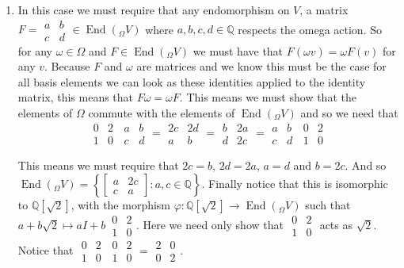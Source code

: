 \documentclass[12pt]{amsart}
\theoremstyle{definition}
\newcommand{\Q}{\mathbb{Q}}
\DeclareMathOperator{\End}{\mathrm{End}}
\newcommand{\ra}{\rightarrow}
\begin{document}
\begin{enumerate}
\item In this case we must require that any endomorphism on $V$, a matrix $F= \boxed{\begin{matrix}
a & b\\
c & d
\end{matrix}}\in \End(_\Omega  V)$ where $a,b,c,d\in\Q$ respects the omega action. So for any $\omega\in \Omega$ and $F\in\End(_\Omega  V)$ we must have that $F(\omega v)=\omega F(v)$ for any $v$. Because $F$ and $\omega$ are matrices and we know this must be the case for all basis elements we can look as these identities applied to the identity matrix, this means that $F\omega=\omega F$. This means we must show that the elements of $\Omega$ commute with the elements of $\End(_\Omega V)$ and so we need that
$$\boxed{\begin{matrix}
0 & 2\\ 1 & 0
\end{matrix}}\, \boxed{\begin{matrix}
a & b\\ c & d
\end{matrix}}= \boxed{\begin{matrix}
2c & 2d\\ a & b
\end{matrix}}=\boxed{\begin{matrix}
    b & 2a\\ d & 2c
\end{matrix}}=\boxed{\begin{matrix}
a & b\\ c & d
\end{matrix}}\,\boxed{\begin{matrix}
0 & 2\\ 1 & 0
\end{matrix}}$$

This means we must require that $2c=b$, $2d=2a$, $a=d$ and $b=2c$. And so $\End(_\Omega V)=\left\{\begin{bmatrix}
    a & 2c\\ c & a
\end{bmatrix}: a,c\in \Q\right\}$. Finally notice that this is isomorphic to $\Q[\sqrt{2}]$, with the morphism $\varphi:\Q[\sqrt{2}] \ra\End(_\Omega V)$ such that $a+b\sqrt{2}\mapsto aI+b \,\boxed{\begin{matrix}
0 & 2\\ 1 & 0
\end{matrix}}$. Here we need only show that $\boxed{\begin{matrix}
0 & 2\\ 1 & 0
\end{matrix}}$ acts as $\sqrt{2}$. Notice that $\boxed{\begin{matrix}
0 & 2\\ 1 & 0
\end{matrix}}\,\boxed{\begin{matrix}
0 & 2\\ 1 & 0
\end{matrix}}=\boxed{\begin{matrix}
2 & 0\\ 0 & 2
\end{matrix}}$.\\


\end{enumerate}
\end{document}
